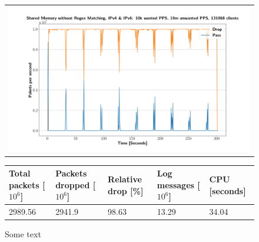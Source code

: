 \begin{figure}[p]
	\label{fig:simplefail2ban:shm:nr}
	\centering
	\scriptsize
	\begin{tabular}{c}
    	\centerline{\includegraphics[width=1.2\textwidth]{images/simplefail2ban_shm_nr_ipv46_v10k_iv10m_c131068.png}}
	\end{tabular}
	\begin{tabular}{lllll}
		\toprule
		\textbf{Total packets [$10^6$]} & \textbf{Packets dropped [$10^6$]} & \textbf{Relative drop [\%]} & \textbf{Log messages [$10^6$]} & \textbf{CPU [seconds]} \\ \midrule 
		2989.56 & 2941.9 & 98.63 & 13.29 & 34.04 \\
		\bottomrule
	\end{tabular}
	\caption[Simplefail2ban, Shared Memory without Regex Matching]{Some text}
\end{figure}

